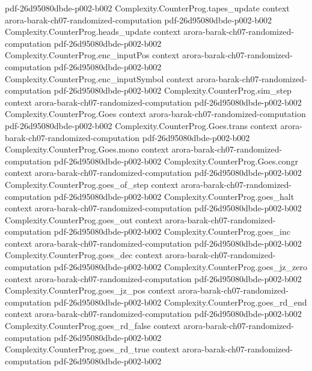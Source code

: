 \begin{theorem}
  {pdf-26d95080dbde-p002-b002}
\proofstep
  {Complexity.CounterProg.tapes_update}
  {context}
  {arora-barak-ch07-randomized-computation}
  {pdf-26d95080dbde-p002-b002}
\proofstep
  {Complexity.CounterProg.heads_update}
  {context}
  {arora-barak-ch07-randomized-computation}
  {pdf-26d95080dbde-p002-b002}
\proofstep
  {Complexity.CounterProg.enc_inputPos}
  {context}
  {arora-barak-ch07-randomized-computation}
  {pdf-26d95080dbde-p002-b002}
\proofstep
  {Complexity.CounterProg.enc_inputSymbol}
  {context}
  {arora-barak-ch07-randomized-computation}
  {pdf-26d95080dbde-p002-b002}
\proofstep
  {Complexity.CounterProg.sim_step}
  {context}
  {arora-barak-ch07-randomized-computation}
  {pdf-26d95080dbde-p002-b002}
\proofstep
  {Complexity.CounterProg.Goes}
  {context}
  {arora-barak-ch07-randomized-computation}
  {pdf-26d95080dbde-p002-b002}
\proofstep
  {Complexity.CounterProg.Goes.trans}
  {context}
  {arora-barak-ch07-randomized-computation}
  {pdf-26d95080dbde-p002-b002}
\proofstep
  {Complexity.CounterProg.Goes.mono}
  {context}
  {arora-barak-ch07-randomized-computation}
  {pdf-26d95080dbde-p002-b002}
\proofstep
  {Complexity.CounterProg.Goes.congr}
  {context}
  {arora-barak-ch07-randomized-computation}
  {pdf-26d95080dbde-p002-b002}
\proofstep
  {Complexity.CounterProg.goes_of_step}
  {context}
  {arora-barak-ch07-randomized-computation}
  {pdf-26d95080dbde-p002-b002}
\proofstep
  {Complexity.CounterProg.goes_halt}
  {context}
  {arora-barak-ch07-randomized-computation}
  {pdf-26d95080dbde-p002-b002}
\proofstep
  {Complexity.CounterProg.goes_out}
  {context}
  {arora-barak-ch07-randomized-computation}
  {pdf-26d95080dbde-p002-b002}
\proofstep
  {Complexity.CounterProg.goes_inc}
  {context}
  {arora-barak-ch07-randomized-computation}
  {pdf-26d95080dbde-p002-b002}
\proofstep
  {Complexity.CounterProg.goes_dec}
  {context}
  {arora-barak-ch07-randomized-computation}
  {pdf-26d95080dbde-p002-b002}
\proofstep
  {Complexity.CounterProg.goes_jz_zero}
  {context}
  {arora-barak-ch07-randomized-computation}
  {pdf-26d95080dbde-p002-b002}
\proofstep
  {Complexity.CounterProg.goes_jz_pos}
  {context}
  {arora-barak-ch07-randomized-computation}
  {pdf-26d95080dbde-p002-b002}
\proofstep
  {Complexity.CounterProg.goes_rd_end}
  {context}
  {arora-barak-ch07-randomized-computation}
  {pdf-26d95080dbde-p002-b002}
\proofstep
  {Complexity.CounterProg.goes_rd_false}
  {context}
  {arora-barak-ch07-randomized-computation}
  {pdf-26d95080dbde-p002-b002}
\proofstep
  {Complexity.CounterProg.goes_rd_true}
  {context}
  {arora-barak-ch07-randomized-computation}
  {pdf-26d95080dbde-p002-b002}

\end{theorem}
